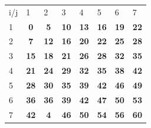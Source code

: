 \documentclass[11pt]{article} %
\begin{document}
\begin{table}[h]
\centering
\begin{tabular}{lccccccc}
i/j                    & \multicolumn{1}{l}{1}            & \multicolumn{1}{l}{2}            & \multicolumn{1}{l}{3}            & \multicolumn{1}{l}{4}            & \multicolumn{1}{l}{5}            & \multicolumn{1}{l}{6}            & \multicolumn{1}{l}{7}            \\ \cline{2-8} 
\multicolumn{1}{l|}{1} & \multicolumn{1}{c|}{\textbf{0}}  & \multicolumn{1}{c|}{\textbf{5}}  & \multicolumn{1}{c|}{\textbf{10}} & \multicolumn{1}{c|}{\textbf{13}} & \multicolumn{1}{c|}{\textbf{16}} & \multicolumn{1}{c|}{\textbf{19}} & \multicolumn{1}{c|}{\textbf{22}} \\ \cline{2-8} 
\multicolumn{1}{l|}{2} & \multicolumn{1}{c|}{\textbf{7}}  & \multicolumn{1}{c|}{\textbf{12}} & \multicolumn{1}{c|}{\textbf{16}} & \multicolumn{1}{c|}{\textbf{20}} & \multicolumn{1}{c|}{\textbf{22}} & \multicolumn{1}{c|}{\textbf{25}} & \multicolumn{1}{c|}{\textbf{28}} \\ \cline{2-8} 
\multicolumn{1}{l|}{3} & \multicolumn{1}{c|}{\textbf{15}} & \multicolumn{1}{c|}{\textbf{18}} & \multicolumn{1}{c|}{\textbf{21}} & \multicolumn{1}{c|}{\textbf{26}} & \multicolumn{1}{c|}{\textbf{28}} & \multicolumn{1}{c|}{\textbf{32}} & \multicolumn{1}{c|}{\textbf{35}} \\ \cline{2-8} 
\multicolumn{1}{l|}{4} & \multicolumn{1}{c|}{\textbf{21}} & \multicolumn{1}{c|}{\textbf{24}} & \multicolumn{1}{c|}{\textbf{29}} & \multicolumn{1}{c|}{\textbf{32}} & \multicolumn{1}{c|}{\textbf{35}} & \multicolumn{1}{c|}{\textbf{38}} & \multicolumn{1}{c|}{\textbf{42}} \\ \cline{2-8} 
\multicolumn{1}{l|}{5} & \multicolumn{1}{c|}{\textbf{28}} & \multicolumn{1}{c|}{\textbf{30}} & \multicolumn{1}{c|}{\textbf{35}} & \multicolumn{1}{c|}{\textbf{39}} & \multicolumn{1}{c|}{\textbf{42}} & \multicolumn{1}{c|}{\textbf{46}} & \multicolumn{1}{c|}{\textbf{49}} \\ \cline{2-8} 
\multicolumn{1}{l|}{6} & \multicolumn{1}{c|}{\textbf{36}} & \multicolumn{1}{c|}{\textbf{36}} & \multicolumn{1}{c|}{\textbf{39}} & \multicolumn{1}{c|}{\textbf{42}} & \multicolumn{1}{c|}{\textbf{47}} & \multicolumn{1}{c|}{\textbf{50}} & \multicolumn{1}{c|}{\textbf{53}} \\ \cline{2-8} 
\multicolumn{1}{l|}{7} & \multicolumn{1}{c|}{\textbf{42}} & \multicolumn{1}{c|}{\textbf{4}}  & \multicolumn{1}{c|}{\textbf{46}} & \multicolumn{1}{c|}{\textbf{50}} & \multicolumn{1}{c|}{\textbf{54}} & \multicolumn{1}{c|}{\textbf{56}} & \multicolumn{1}{c|}{\textbf{60}} \\ \cline{2-8} 
\end{tabular}
\end{table}
\end{document}
